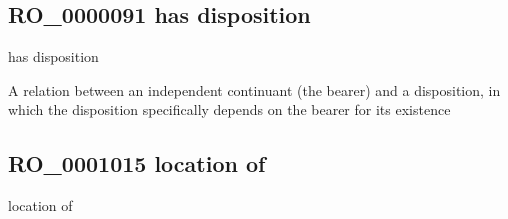 \documentclass[letterpaper,10pt,english]{sphinxmanual}
\begin{document}
\begin{sphinxShadowBox}

\sphinxAtStartPar
{}
\end{sphinxShadowBox}
\begin{quote}

\ignorespaces \end{quote}


\subsection{RO\_0000091 \sphinxhyphen{} has disposition}
\label{\detokenize{doc-RO_0000091:ro-0000091-has-disposition}}\label{\detokenize{doc-RO_0000091:index-0}}\label{\detokenize{doc-RO_0000091::doc}}
\begin{sphinxShadowBox}

\sphinxAtStartPar
has disposition
\end{sphinxShadowBox}

\begin{sphinxShadowBox}

\sphinxAtStartPar
A relation between an independent continuant (the bearer) and a disposition, in which the disposition specifically depends on the bearer for its existence
\end{sphinxShadowBox}

\begin{sphinxShadowBox}

\sphinxAtStartPar
{}
\end{sphinxShadowBox}
\begin{quote}

\ignorespaces \end{quote}


\subsection{RO\_0001015 \sphinxhyphen{} location of}
\label{\detokenize{doc-RO_0001015:ro-0001015-location-of}}\label{\detokenize{doc-RO_0001015:index-0}}\label{\detokenize{doc-RO_0001015::doc}}
\begin{sphinxShadowBox}

\sphinxAtStartPar
location of
\end{sphinxShadowBox}
\end{document}

